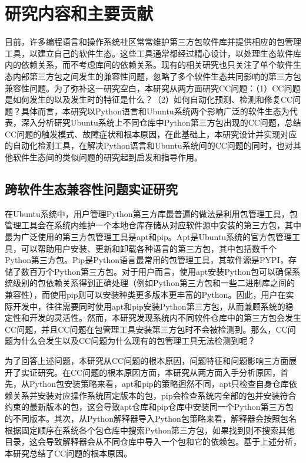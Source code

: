 \section{研究内容和主要贡献}
目前，许多编程语言和操作系统社区常常维护第三方包软件库并提供相应的包管理工具，以建立自己的软件生态。这些工具通常都经过精心设计，以处理生态软件库内的依赖关系，而不考虑库间的依赖关系。现有的相关研究也只关注了单个软件生态内部第三方包之间发生的兼容性问题，忽略了多个软件生态共同影响的第三方包兼容性问题。为了弥补这一研究空白，本研究从两方面研究CC问题：（1）CC问题是如何发生的以及发生时的特征是什么？（2）如何自动化预测、检测和修复CC问题？具体而言，本研究以Python语言和Ubuntu系统两个影响广泛的软件生态为代表，深入分析研究Ubuntu系统上不同仓库中Python第三方包出现的CC问题，总结CC问题的触发模式、故障症状和根本原因，在此基础上，本研究设计并实现对应的自动化检测工具，在解决Python语言和Ubuntu系统间的CC问题的同时，也对其他软件生态间的类似问题的研究起到启发和指导作用。
\subsection{跨软件生态兼容性问题实证研究}\label{1.3.1}
在Ubuntu系统中，用户管理Python第三方库最普遍的做法是利用包管理工具，包管理工具会在系统内维护一个本地仓库存储从对应软件源中安装的第三方包，其中最为广泛使用的第三方包管理工具是apt和pip。Apt是Ubuntu系统的官方包管理工具，可以帮助用户安装、更新和卸载各种语言的第三方包，其中包括数千个Python第三方包。Pip是Python语言最常用的包管理工具，其软件源是PYPI，存储了数百万个Python第三方包。对于用户而言，使用apt安装Python包可以确保系统级别的包依赖关系得到正确处理（例如Python第三方包和一些二进制库之间的兼容性），而使用pip则可以安装种类更多版本更丰富的Python。因此，用户在实际开发中，往往需要同时使用apt和pip安装Python第三方包，从而兼顾系统的稳定性和开发的灵活性。然而，本研究发现系统内不同软件仓库中的第三方包会发生CC问题，并且CC问题在包管理工具安装第三方包时不会被检测到。那么，CC问题为什么会发生以及CC问题为什么现有的包管理工具无法检测到呢？

为了回答上述问题，本研究从CC问题的根本原因，问题特征和问题影响三方面展开了实证研究。在CC问题的根本原因方面，本研究从两方面入手分析原因，首先，从Python包安装策略来看，apt和pip的策略迥然不同，apt只检查自身仓库依赖关系并安装对应操作系统固定版本的包，pip会检查系统内全部的包并安装符合约束的最新版本的包，这会导致apt仓库和pip仓库中安装同一个Python第三方包的不同版本。其次，从Python解释器导入Python包策略来看，解释器会按照包名根据固定顺序在系统各个包仓库中搜索Python第三方包，如果找到则不搜索其他目录，这会导致解释器会从不同仓库中导入一个包和它的依赖包。基于上述分析，本研究总结了CC问题的根本原因。

